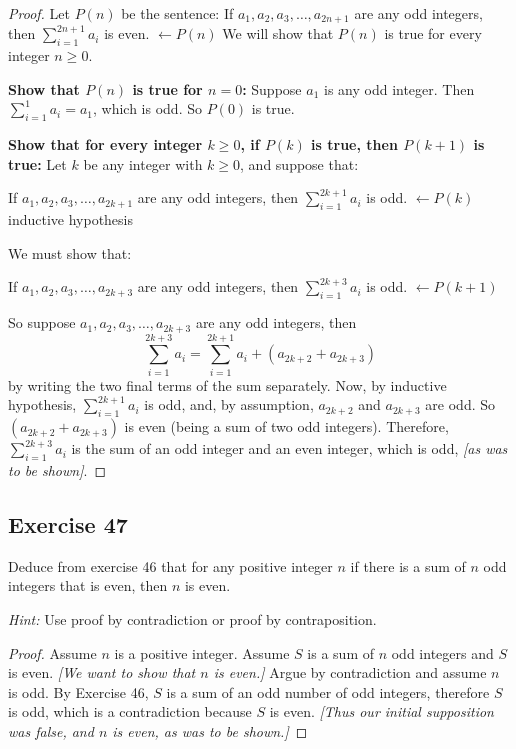 \documentclass[14pt]{extarticle}
\newcommand{\from}{\leftarrow}
\newcommand{\cy}{\color{cyan}}
\begin{document}
\begin{proof}
Let $P(n)$ be the sentence: If \(a_1, a_2, a_3, \ldots, a_{2n+1}\) are any odd integers, then 
\(\sum_{i=1}^{2n+1} a_i\) is even. {\cy \(\from P(n)\)} 
We will show that $P(n)$ is true for every integer \(n \geq 0\). 

{\bf Show that $P(n)$ is true for $n = 0$:} Suppose $a_1$ is any odd integer. Then \(\sum_{i = 1}^1 a_i = a_1\), 
which is odd. So $P(0)$ is true. 

{\bf Show that for every integer \(k \geq 0\), if $P(k)$ is true, then $P(k + 1)$ is true:} Let $k$ be any integer with 
\(k \geq 0\), and suppose that:

If \(a_1, a_2, a_3, \ldots, a_{2k+1}\) are any odd integers, then \(\sum_{i = 1}^{2k+1} a_i\) is odd. {\cy \(\from P(k)\) inductive hypothesis}  

We must show that:

If \(a_1, a_2, a_3, \ldots, a_{2k+3}\) are any odd integers, then \(\sum_{i = 1}^{2k+3} a_i\) is odd. 
{\cy \(\from P(k + 1)\)} 

So suppose \(a_1, a_2, a_3, \ldots, a_{2k+3}\) are any odd integers, then 
\[
\sum_{i = 1}^{2k+3} a_i = \sum_{i = 1}^{2k+1} a_i + (a_{2k+2} + a_{2k+3})
\]
by writing the two final terms of the sum separately. Now, by inductive hypothesis, \(\sum_{i = 1}^{2k+1} a_i\) is 
odd, and, by assumption, $a_{2k+2}$ and $a_{2k+3}$ are odd. So \((a_{2k+2} + a_{2k+3})\) is even (being a sum of two 
odd integers). Therefore, \(\sum_{i = 1}^{2k+3} a_i\) is the sum of an odd integer and an even integer, which is
odd, {\it [as was to be shown]}.
\end{proof}

\subsection{Exercise 47}
Deduce from exercise 46 that for any positive integer $n$ if there is a sum of $n$ odd integers that is even, then $n$ is even.

{\it Hint:} Use proof by contradiction or proof by contraposition.

\begin{proof}
Assume $n$ is a positive integer. Assume $S$ is a sum of $n$ odd integers and $S$ is even. {\it [We want to show 
that $n$ is even.]} Argue by contradiction and assume $n$ is odd. By Exercise 46, $S$ is a sum of an odd number of 
odd integers, therefore $S$ is odd, which is a contradiction because $S$ is even. {\it [Thus our initial
supposition was false, and $n$ is even, as was to be shown.]}
\end{proof}
\end{document}
